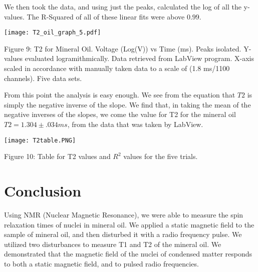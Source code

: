 \documentclass{article}
\begin{document}
    \bigskip
    
    We then took the data, and using just the peaks, calculated the log of all the y-values. The R-Squared of all of these linear fits were above $0.99$.
    
    
       \bigskip
    
    \begin{figure889}
    \centering    
    \texttt{[image: T2\_oil\_graph\_5.pdf]}
    \par
    \centering
    \par
    \caption{Figure 9: T2 for Mineral Oil. Voltage (Log(V)) vs Time (ms). Peaks isolated. Y-values evaluated logramithmically. Data retrieved from LabView program. X-axis scaled in accordance with manually taken data to a scale of (1.8 ms/1100 channels). Five data sets.}
    \par
    \end{figure889}
    \bigksip
    
    \bigskip
    From this point the analysis is easy enough. We see from the equation that $T2$ is simply the negative inverse of the slope. We find that, in taking the mean of the negative inverses of the slopes, we come the value for T2 for the mineral oil $T2 = 1.304 \pm .034 ms$, from the data that was taken by LabView.
      \bigskip
    
    \begin{figure7889}
    \centering    
    \texttt{[image: T2table.PNG]}
    \par
    \centering
    \par
    \caption{Figure 10: Table for T2 values and $R^{2}$ values for the five trials.}
    \par
    \end{figure7889}
    \bigksip

\section{Conclusion}
   Using NMR (Nuclear Magnetic Resonance), we were able to measure the spin relaxation times of nuclei in mineral oil. We applied a static magnetic field to the sample of mineral oil, and then disturbed it with a radio frequency pulse. We utilized two disturbances to measure T1 and T2 of the mineral oil. We demonstrated that the magnetic field of the nuclei of condensed matter responds to both a static magnetic field, and to pulsed radio frequencies. 

\bigskip
\bigskip
\end{document}
